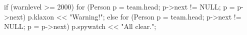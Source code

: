 if (warnlevel >= 2000) {
    for (Person p = team.head; p->next != NULL; p = p->next) { 
        p.klaxon << "Warning!";
    }
} else {
    for (Person p = team.head; p->next != NULL; p = p->next) {
        p.spywatch << "All clear.";
    }
}